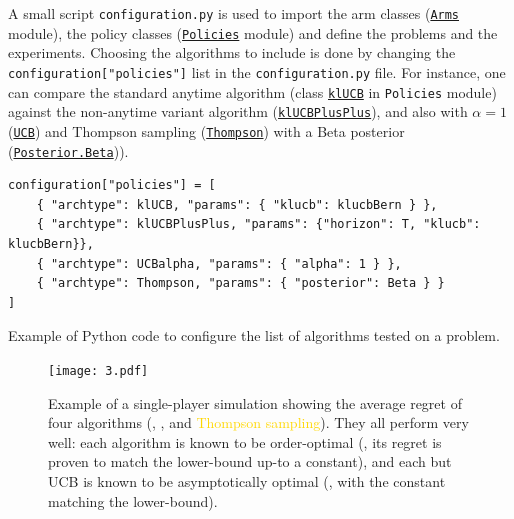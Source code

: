 A small script \texttt{configuration.py}
is used to import the arm classes (\texttt{\href{https://SMPyBandits.GitHub.io/docs/Arms.html}{Arms}} module), the policy classes (\texttt{\href{https://SMPyBandits.GitHub.io/docs/Policies.html}{Policies}} module) and define the problems and the experiments.
Choosing the algorithms to include is done by changing
the \texttt{configuration["policies"]} list in the \texttt{configuration.py} file.
For instance, one can compare the standard anytime \klUCB{} algorithm (class \texttt{\href{https://SMPyBandits.GitHub.io/docs/Policies.klUCB.html}{klUCB}} in \texttt{Policies} module) against the non-anytime variant \KLUCBpp{} algorithm (\texttt{\href{https://SMPyBandits.GitHub.io/docs/Policies.klUCBPlusPlus.html}{klUCBPlusPlus}}), and also \UCB{} with $\alpha=1$ (\texttt{\href{https://SMPyBandits.GitHub.io/docs/Policies.UCBalpha.html}{UCB}}) and Thompson sampling (\texttt{\href{https://SMPyBandits.GitHub.io/docs/Policies.Thompson.html}{Thompson}}) with a Beta posterior (\texttt{\href{https://SMPyBandits.GitHub.io/docs/Policies.Posterior.Beta.html}{Posterior.Beta}})).

\begin{small}
\begin{listing}[h!]
    \begin{verbatim}
configuration["policies"] = [
    { "archtype": klUCB, "params": { "klucb": klucbBern } },
    { "archtype": klUCBPlusPlus, "params": {"horizon": T, "klucb": klucbBern}},
    { "archtype": UCBalpha, "params": { "alpha": 1 } },
    { "archtype": Thompson, "params": { "posterior": Beta } }
]
    \end{verbatim}
    \caption{Example of Python code to configure the list of algorithms tested on a problem.}
    \label{lst:3:howToConfigureAlgorithms}
\end{listing}
\end{small}

\begin{figure}[h!]  %
	\centering
	\texttt{[image: 3.pdf]}
	\caption[Example of a single-player simulation showing the average regret of $4$ algorithms.]{
		Example of a single-player simulation showing the average regret of four algorithms (\textcolor{red}{\UCB}, \textcolor{blue}{\KLUCBpp}, \textcolor{darkgreen}{\klUCB} and \textcolor{gold}{Thompson sampling}). They all perform very well: each algorithm is known to be order-optimal (\ie, its regret is proven to match the lower-bound up-to a constant), and each but UCB is known to be asymptotically optimal (\ie, with the constant matching the lower-bound).
	}
	\label{fig:3:firstPlot}
\end{figure}

